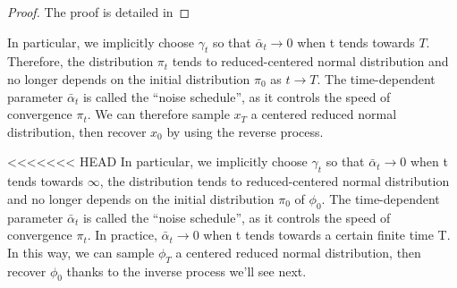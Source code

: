\documentclass[a4paper,10pt]{article}
\theoremstyle{definition} %
\theoremstyle{definition} %
\newtheorem{proposition}[definition]{Proposition}
\theoremstyle{definition} %
\theoremstyle{definition} %
\newcommand{\R}{\mathbb{R}}
\newcommand{\0}{\boldsymbol{0}}
\begin{document}
\begin{proof}
    The proof is detailed in 
\end{proof}
In particular, we implicitly choose $\gamma_t$ so that $\bar \alpha_t \rightarrow 0$ when t tends towards $T$. Therefore, the distribution $\pi_t$ tends to reduced-centered normal distribution and no longer depends on the initial  distribution $\pi_0$ as $t \rightarrow T$. The time-dependent parameter $\bar \alpha_t$ is called the “noise schedule”, as it controls the speed of convergence $\pi_t$. We can therefore sample $x_T$ a centered reduced normal distribution, then recover $x_0$ by using the reverse process.





<<<<<<< HEAD
In particular, we implicitly choose $\gamma_t$ so that $\bar \alpha_t \rightarrow 0$ when t tends towards $\infty$, the distribution tends to reduced-centered normal distribution and no longer depends on the initial  distribution $\pi_0$ of $\phi_0$. The time-dependent parameter $\bar \alpha_t$ is called the “noise schedule”, as it controls the speed of convergence $\pi_t$. In practice, $\bar \alpha_t \rightarrow 0$ when t tends towards a certain finite time T. In this way, we can sample $\phi_T$ a centered reduced normal distribution, then recover $\phi_0$ thanks to the inverse process we'll see next.
\end{document}
